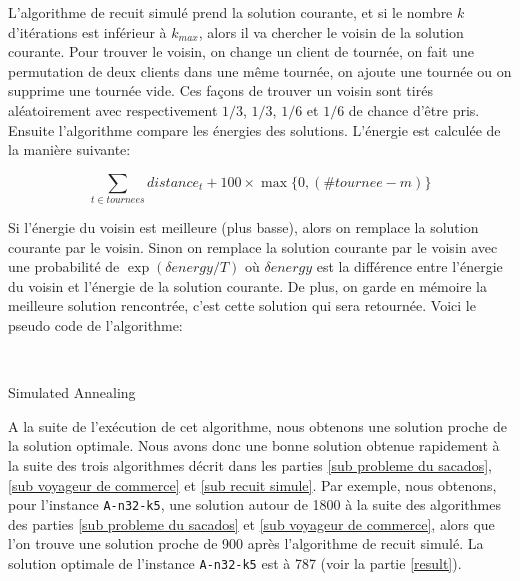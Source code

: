 L'algorithme de recuit simulé prend la solution courante, et si le nombre $k$ d'itérations est inférieur à $k_{max}$, alors il va chercher le voisin de la solution courante. Pour trouver le voisin, on change un client de tournée, on fait une permutation de deux clients dans une même tournée, on ajoute une tournée ou on supprime une tournée vide. Ces façons de trouver un voisin sont tirés aléatoirement avec respectivement $1/3$, $1/3$, $1/6$ et $1/6$ de chance d'être pris. Ensuite l'algorithme compare les énergies des solutions. L'énergie est calculée de la manière suivante:

\begin{equation}
\label{equation energie}
    \sum_{t \in tournees} distance_t + 100 \times \max \{0, (\#tournee - m)\}
\end{equation}

Si l'énergie du voisin est meilleure (plus basse), alors on remplace la solution courante par le voisin. Sinon on remplace la solution courante par le voisin avec une probabilité de $\exp(\delta energy / T)$ où $\delta energy$ est la différence entre l'énergie du voisin et l'énergie de la solution courante. De plus, on garde en mémoire la meilleure solution rencontrée, c'est cette solution qui sera retournée. Voici le pseudo code de l'algorithme:

\begin{algorithm}[H]
    \label{A Simulated Annealing}
    \\
    \caption{Simulated Annealing}
\end{algorithm}

A la suite de l'exécution de cet algorithme, nous obtenons une solution proche de la solution optimale. Nous avons donc une bonne solution obtenue rapidement à la suite des trois algorithmes décrit dans les parties \ref{sub probleme du sacados}, \ref{sub voyageur de commerce} et \ref{sub recuit simule}. Par exemple, nous obtenons, pour l'instance \texttt{A-n32-k5}, une solution autour de 1800 à la suite des algorithmes des parties \ref{sub probleme du sacados} et \ref{sub voyageur de commerce}, alors que l'on trouve une solution proche de 900 après l'algorithme de recuit simulé. La solution optimale de l'instance \texttt{A-n32-k5} est à 787 (voir la partie \ref{result}).